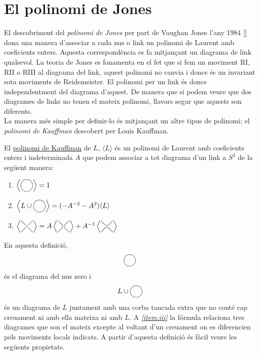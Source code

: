 
\section{El polinomi de Jones}\label{sec:El polinomi de Jones}

El descobriment del \textit{polinomi de Jones} per part de Vaughan Jones l'any 1984 [\cite{jonesoriginal}] dona una manera d'associar a cada nus o link un polinomi de Laurent amb coeficients enters. Aquesta correspondència es fa mitjançant un diagrama de link qualsevol. La teoria de Jones es fonamenta en el fet que si fem un moviment RI, RII o RIII al diagrama del link, aquest polinomi no canvia i doncs és un invariant sota moviments de Reidemeister. El polinomi per un link és doncs independentment del diagrama d'aquest. De manera que si podem veure que dos diagrames de links no tenen el mateix polinomi, llavors segur que aquests son diferents.\\

La manera més simple per definir-lo és mitjançant un altre tipus de polinomi; el \textit{polinomi de Kauffman} descobert per Louis Kauffman.\\

\begin{definition}
	El \underline{polinomi de Kauffman} de $L$, $\langle L\rangle$ és un polinomi de Laurent amb coeficients enters i indeterminada $A$ que podem associar a tot diagrama d'un link a $S^2$ de la següent manera:
	\begin{enumerate}
		\item\label{item:i} $\left\langle\KPA\right\rangle=1$
		\item\label{item:ii} $\left\langle L \cup \KPA\right\rangle=(-A^{-2}-A^{2})\langle L\rangle$
		\item\label{item:iii} $\left\langle\KPB\right\rangle=
		A\left\langle\KPC\right\rangle + A^{-1} \left\langle \KPD \right\rangle$
	\end{enumerate}
\end{definition}

En aquesta definició, $$\KPA$$ és el diagrama del nus zero i $$L \cup \KPA$$ és un diagrama de $L$ juntament amb una corba tancada extra que no conté cap creuament ni amb ella mateixa ni amb $L$. A \textit{\ref{item:iii}} la fórmula relaciona tres diagrames que son el mateix excepte al voltant d'un creuament on es diferencien pels moviments locals indicats. A partir d'aquesta definició és fàcil veure les següents propietats.

